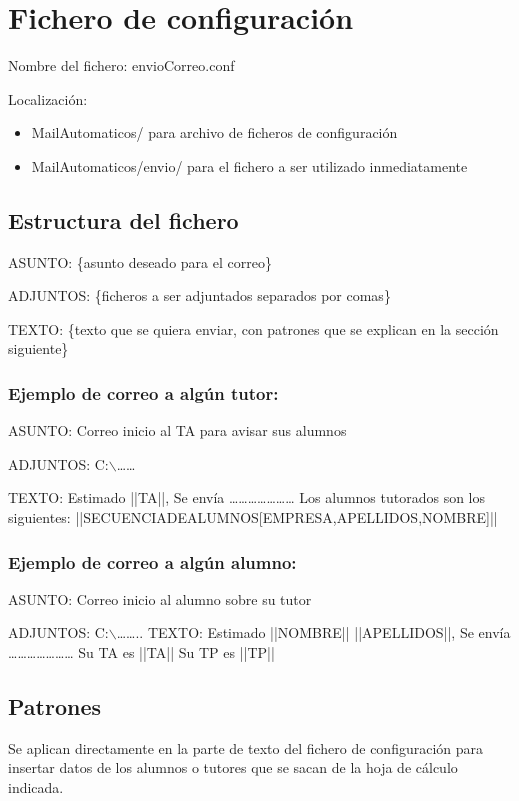 \documentclass[11pt]{article}
\begin{document}
\section{Fichero de configuración}
\label{sec-4}
Nombre del fichero: envioCorreo.conf

Localización:
\begin{itemize}
\item MailAutomaticos/ para archivo de ficheros de configuración
\item MailAutomaticos/envio/ para el fichero a ser utilizado inmediatamente
\end{itemize}
\subsection{Estructura del fichero}
\label{sec-4-1}
ASUNTO: \{asunto deseado para el correo\}

ADJUNTOS: \{ficheros a ser adjuntados separados por comas\}

TEXTO: \{texto que se quiera enviar, con patrones que se explican en la sección siguiente\}

\subsubsection{Ejemplo de correo a algún tutor:}
\label{sec-4-1-1}

ASUNTO: Correo inicio al TA para avisar sus alumnos

ADJUNTOS: C:$\backslash$\ldots{}\ldots{}

TEXTO: Estimado ||TA||,
Se envía \ldots{}\ldots{}\ldots{}\ldots{}\ldots{}\ldots{}\ldots{}
Los alumnos tutorados son los siguientes: ||SECUENCIADEALUMNOS[EMPRESA,APELLIDOS,NOMBRE]||

\subsubsection{Ejemplo de correo a algún alumno:}
\label{sec-4-1-2}

ASUNTO: Correo inicio al alumno sobre su tutor

ADJUNTOS: C:$\backslash$\ldots{}\ldots{}..
TEXTO: Estimado ||NOMBRE|| ||APELLIDOS||,
Se envía \ldots{}\ldots{}\ldots{}\ldots{}\ldots{}\ldots{}\ldots{}
Su TA es ||TA||
Su TP es ||TP||


\subsection{Patrones}
\label{sec-4-2}
Se aplican directamente en la parte de texto del fichero de configuración para insertar datos de los alumnos o tutores que se sacan de la hoja de cálculo indicada.
\end{document}
